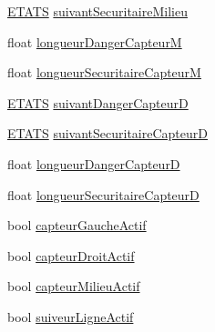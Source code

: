 \begin{DoxyCompactItemize}
\item 
\hyperlink{group__inf2990_gad63ae859c24061076ed6dbe35f4671b5}{E\+T\+A\+TS} \hyperlink{group__inf2990_gab292a1934fdf2cf1b8830499c851b7b8}{suivant\+Securitaire\+Milieu}
\item 
float \hyperlink{group__inf2990_ga0dc61e0bd26d94571ac7508cd28abceb}{longueur\+Danger\+CapteurM}
\item 
float \hyperlink{group__inf2990_gab362f3ff5e5ac86deea1fd0065658c75}{longueur\+Securitaire\+CapteurM}
\item 
\hyperlink{group__inf2990_gad63ae859c24061076ed6dbe35f4671b5}{E\+T\+A\+TS} \hyperlink{group__inf2990_ga4b4dcdfecb1dde6cf8681d86a853b33b}{suivant\+Danger\+CapteurD}
\item 
\hyperlink{group__inf2990_gad63ae859c24061076ed6dbe35f4671b5}{E\+T\+A\+TS} \hyperlink{group__inf2990_ga6afecd65d01a5947126357e7fd96c038}{suivant\+Securitaire\+CapteurD}
\item 
float \hyperlink{group__inf2990_ga10a65d5b87b46d58fb7cc5053df3cb43}{longueur\+Danger\+CapteurD}
\item 
float \hyperlink{group__inf2990_ga5e7613080b37ed6815b16e0757a522b7}{longueur\+Securitaire\+CapteurD}
\item 
bool \hyperlink{group__inf2990_gae67f02930220db32cfebe3c1907b80aa}{capteur\+Gauche\+Actif}
\item 
bool \hyperlink{group__inf2990_gaa628956886cdfc6215358f6a9434282a}{capteur\+Droit\+Actif}
\item 
bool \hyperlink{group__inf2990_ga60e763410dd2944389b069d53960dfb8}{capteur\+Milieu\+Actif}
\item 
bool \hyperlink{group__inf2990_gabd4134f2950622459e7c716f0c268205}{suiveur\+Ligne\+Actif}
\end{DoxyCompactItemize}


